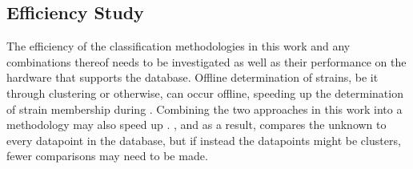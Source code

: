 \subsection{Efficiency Study}
The efficiency of the classification methodologies in this work and any combinations thereof needs to be investigated as well as their performance on the hardware that supports the \cplop{} database.
Offline determination of strains, be it through clustering or otherwise, can occur offline, speeding up the determination of strain membership during \mst{}.
Combining the two approaches in this work into a \kNClong{} methodology may also speed up \mst{}.
\kNN{}, and \krap{} as a result, compares the unknown \isol{} to every datapoint in the database, but if instead the datapoints might be clusters, fewer comparisons may need to be made.